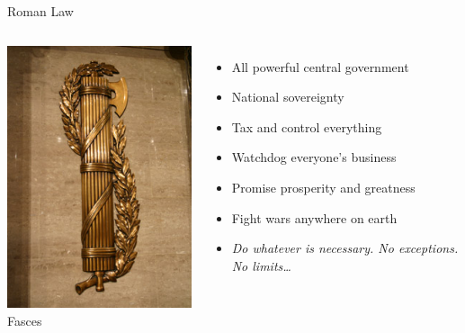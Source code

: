 \begin{frame}{Roman Law}
    \begin{columns}[onlytextwidth]
            \centering
            \includegraphics[height=0.75\textheight]{img/fasces.png} \\
            Fasces \\

            \begin{itemize}
                \item All powerful central government
                \item National sovereignty
                \item Tax and control everything
                \item Watchdog everyone's business
                \item Promise prosperity and greatness
                \item Fight wars anywhere on earth
                \pause
                \item \emph{Do whatever is necessary. No exceptions. No limits\ldots}
            \end{itemize}
    \end{columns}
\end{frame}


